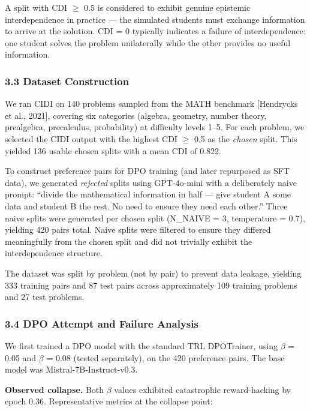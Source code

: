 \documentclass[
  11pt,
]{article}
\begin{document}
A split with CDI $\geq$ 0.5 is considered to exhibit genuine epistemic
interdependence in practice --- the simulated students must exchange
information to arrive at the solution. CDI = 0 typically indicates a
failure of interdependence: one student solves the problem unilaterally
while the other provides no useful information.

\subsubsection{3.3 Dataset Construction}\label{dataset-construction}

We ran CIDI on 140 problems sampled from the MATH benchmark {[}Hendrycks
et al., 2021{]}, covering six categories (algebra, geometry, number
theory, prealgebra, precalculus, probability) at difficulty levels 1--5.
For each problem, we selected the CIDI output with the highest CDI $\geq$ 0.5
as the \emph{chosen} split. This yielded 136 usable chosen splits with a
mean CDI of 0.822.

To construct preference pairs for DPO training (and later repurposed as
SFT data), we generated \emph{rejected} splits using GPT-4o-mini with a
deliberately naive prompt: ``divide the mathematical information in half
--- give student A some data and student B the rest. No need to ensure
they need each other.'' Three naive splits were generated per chosen
split (N\_NAIVE = 3, temperature = 0.7), yielding 420 pairs total. Naive
splits were filtered to ensure they differed meaningfully from the
chosen split and did not trivially exhibit the interdependence
structure.

The dataset was split by problem (not by pair) to prevent data leakage,
yielding 333 training pairs and 87 test pairs across approximately 109
training problems and 27 test problems.

\subsubsection{3.4 DPO Attempt and Failure
Analysis}\label{dpo-attempt-and-failure-analysis}

We first trained a DPO model with the standard TRL DPOTrainer, using $\beta$ =
0.05 and $\beta$ = 0.08 (tested separately), on the 420 preference pairs. The
base model was Mistral-7B-Instruct-v0.3.

\textbf{Observed collapse.} Both $\beta$ values exhibited catastrophic
reward-hacking by epoch 0.36. Representative metrics at the collapse
point:
\end{document}
